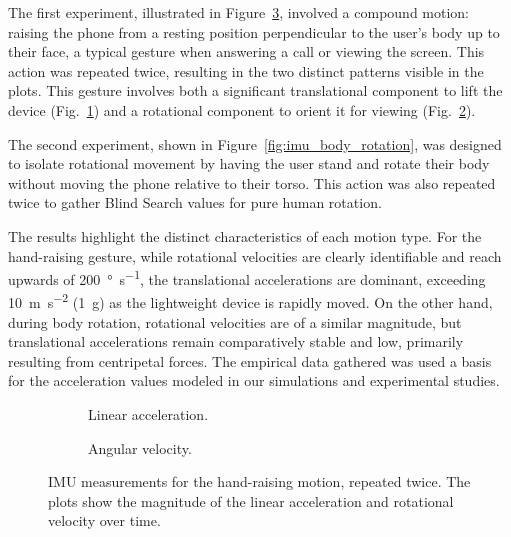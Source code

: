 \documentclass[fleqn,10pt]{wlscirep}
\begin{document}
The first experiment, illustrated in Figure~\ref{fig:imu_hand_motion}, involved a compound motion: raising the phone from a resting position perpendicular to the user's body up to their face, a typical gesture when answering a call or viewing the screen. This action was repeated twice, resulting in the two distinct patterns visible in the plots. This gesture involves both a significant translational component to lift the device (Fig.~\ref{fig:imu_hand_linear}) and a rotational component to orient it for viewing (Fig.~\ref{fig:imu_hand_angular}).

The second experiment, shown in Figure~\ref{fig:imu_body_rotation}, was designed to isolate rotational movement by having the user stand and rotate their body without moving the phone relative to their torso. This action was also repeated twice to gather Blind Search values for pure human rotation.

The results highlight the distinct characteristics of each motion type. For the hand-raising gesture, while rotational velocities are clearly identifiable and reach upwards of \SI{200}{\degree\per\second}, the translational accelerations are dominant, exceeding \SI{10}{\meter\per\second\squared} (\SI{1}{g}) as the lightweight device is rapidly moved. On the other hand, during body rotation, rotational velocities are of a similar magnitude, but translational accelerations remain comparatively stable and low, primarily resulting from centripetal forces. The empirical data gathered was used a basis for the acceleration values modeled in our simulations and experimental studies.

\begin{figure}[h!]
    \centering
    \begin{subfigure}{0.99\linewidth}
        \centering
        
        \vspace{-2.5 em}
        \caption{Linear acceleration.}
        \label{fig:imu_hand_linear}
    \end{subfigure}
    
    \begin{subfigure}{0.99\linewidth}
        \centering
        \vspace{1 em}
        
        \vspace{-2.5 em}
        \caption{Angular velocity.}
        \label{fig:imu_hand_angular}
    \end{subfigure}
    \caption{IMU measurements for the hand-raising motion, repeated twice. The plots show the magnitude of the linear acceleration and rotational velocity over time.}
    \label{fig:imu_hand_motion}
\end{figure}
\end{document}
